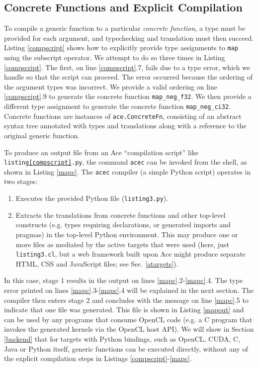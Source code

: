 \documentclass[9pt,preprint]{sigplanconf}
\begin{document}
\subsection{Concrete Functions and Explicit Compilation}
To compile a generic function to a particular \emph{concrete function}, a type must be provided for each argument, and typechecking and translation must then succeed. Listing \ref{compscript} shows how to explicitly provide type assignments to \verb|map| using the subscript operator. We attempt to do so three times in Listing \ref{compscript}. The first, on line \ref{compscript}.7, fails due to a type error, which we handle so that the script can proceed. The error occurred  because the ordering of the argument types was incorrect. We provide a valid ordering on line \ref{compscript}.9 to generate the concrete function \verb|map_neg_f32|. We then provide a different type assignment to generate the concrete function \verb|map_neg_ci32|.
Concrete functions are instances of \verb|ace.ConcreteFn|, consisting of an abstract syntax tree annotated with types and translations along with a reference to the original generic function. %

To produce an output file from an Ace ``compilation script'' like \verb|listing|\texttt{\ref{compscript}}\verb|.py|, the command \verb|acec| can be invoked from the shell, as shown in Listing \ref{mapc}. The \verb|acec| compiler (a simple Python script) operates in two stages:
\begin{enumerate}
\item Executes the provided Python file (\verb|listing3.py|).
\item Extracts the translations from concrete functions and other top-level constructs (e.g. types requiring declarations, or generated imports and pragmas) in the top-level Python environment.  This may produce one or more files as mediated by the active targets that were used (here, just \verb|listing3.cl|, but a web framework built upon Ace might produce separate HTML, CSS and JavaScript files; see Sec. \ref{atargets}).
\end{enumerate}

In this case, stage 1 results in the output on lines \ref{mapc}.2-\ref{mapc}.4. The type error printed on lines \ref{mapc}.3-\ref{mapc}.4 will be explained in the next section. The compiler then enters stage 2 and concludes with the message on line \ref{mapc}.5 to indicate that one file was generated. This file is shown in Listing \ref{mapout} and can be used by any programs that consume OpenCL code (e.g. a C program that invokes the generated kernels via the OpenCL host API). 
We will show in Section \ref{backend} that for targets with Python bindings, such as OpenCL, CUDA, C, Java or Python itself, generic functions can be executed directly, without any of the explicit compilation steps in Listings \ref{compscript}-\ref{mapc}.
\end{document}
